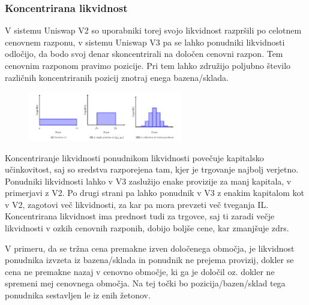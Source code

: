 \documentclass[a4paper,12pt]{article}%
\begin{document}
\subsubsection{Koncentrirana likvidnost}

V sistemu Uniswap V2 so uporabniki torej svojo likvidnost razpršili po celotnem cenovnem razponu, v sistemu Uniswap V3 pa se lahko ponudniki likvidnosti odločijo, da bodo svoj denar skoncentrirali na določen cenovni razpon. Tem cenovnim razponom pravimo pozicije. 
Pri tem lahko združijo poljubno število različnih koncentriranih pozicij znotraj enega bazena/sklada.

\begin{figure}[!ht]
    \centering
    \includegraphics[width=0.6\textwidth]{pozicije.png}
\end{figure}

Koncentriranje likvidnosti ponudnikom likvidnosti povečuje kapitalsko učinkovitost, saj so sredstva razporejena tam, kjer je trgovanje najbolj verjetno. Ponudniki likvidnosti lahko v V3 zaslužijo enake provizije za manj kapitala, v primerjavi z V2. 
Po drugi strani pa lahko ponudnik v V3 z enakim kapitalom kot v V2, zagotovi več likvidnosti, za kar pa mora prevzeti več tveganja IL. 
Koncentrirana likvidnost ima prednost tudi za trgovce, saj ti zaradi večje likvidnosti v ozkih cenovnih razponih, dobijo boljše cene, kar zmanjšuje zdrs.  


V primeru, da se tržna cena premakne izven določenega območja, je likvidnost ponudnika izvzeta iz bazena/sklada in ponudnik ne prejema provizij, dokler se cena ne premakne nazaj v cenovno območje, ki ga je določil oz. dokler ne spremeni mej cenovnega območja. Na tej točki bo pozicija/bazen/sklad tega ponudnika sestavljen le iz enih žetonov. 
\end{document}
